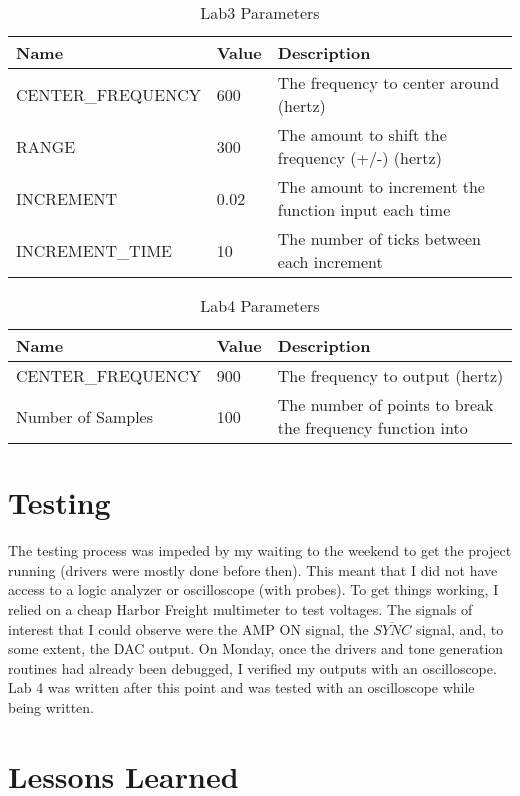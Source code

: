\documentclass[titlepage]{article}
\begin{document}
\begin{table}[H]
    \begin{tabular}{| l | l | p{4cm} |}
        \hline
        \textbf{Name} & \textbf{Value} & \textbf{Description} \\
        \hline
        CENTER\_FREQUENCY & 600 & The frequency to center around (hertz) \\
        RANGE & 300 & The amount to shift the frequency (+/-) (hertz) \\
        INCREMENT & 0.02 & The amount to increment the function input each time \\
        INCREMENT\_TIME & 10 & The number of ticks between each increment \\
        \hline
    \end{tabular}
    \caption{Lab3 Parameters}
\end{table}

\begin{table}[H]
    \begin{tabular}{| l | l | p{4cm} |}
        \hline
        \textbf{Name} & \textbf{Value} & \textbf{Description} \\
        \hline
        CENTER\_FREQUENCY & 900 & The frequency to output (hertz) \\
        Number of Samples & 100 & The number of points to break the frequency function into \\
        \hline
    \end{tabular}
    \caption{Lab4 Parameters}
\end{table}
\pagebreak
\section{Testing}
The testing process was impeded by my waiting to the weekend to get 
the project running (drivers were mostly done before then). This meant 
that I did not have access to a logic analyzer or oscilloscope (with probes). 
To get things working, I relied on a cheap Harbor Freight multimeter to test voltages.
The signals of interest that I could observe were the AMP ON signal, the $\overline{SYNC}$
signal, and, to some extent, the DAC output. On Monday, once the drivers and tone 
generation routines had already been debugged, I verified my outputs with 
an oscilloscope. Lab 4 was written after this point and was tested with 
an oscilloscope while being written.
\pagebreak
\section{Lessons Learned}
\end{document}
